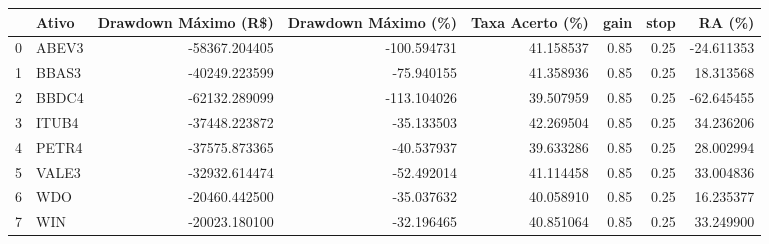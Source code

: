 \begin{tabular}{llrrrrrr}
\toprule
{} & Ativo &  Drawdown Máximo (R\$) &  Drawdown Máximo (\%)  &       Taxa Acerto (\%) &  gain &  stop &  RA (\%) \\
\midrule
0 &      ABEV3 &     -58367.204405 &                  -100.594731 &  41.158537 &  0.85 &  0.25 &          -24.611353 \\
1 &      BBAS3 &     -40249.223599 &                   -75.940155 &  41.358936 &  0.85 &  0.25 &           18.313568 \\
2 &      BBDC4 &     -62132.289099 &                  -113.104026 &  39.507959 &  0.85 &  0.25 &          -62.645455 \\
3 &      ITUB4 &     -37448.223872 &                   -35.133503 &  42.269504 &  0.85 &  0.25 &           34.236206 \\
4 &      PETR4 &     -37575.873365 &                   -40.537937 &  39.633286 &  0.85 &  0.25 &           28.002994 \\
5 &      VALE3 &     -32932.614474 &                   -52.492014 &  41.114458 &  0.85 &  0.25 &           33.004836 \\
6 &        WDO &     -20460.442500 &                   -35.037632 &  40.058910 &  0.85 &  0.25 &           16.235377 \\
7 &        WIN &     -20023.180100 &                   -32.196465 &  40.851064 &  0.85 &  0.25 &           33.249900 \\
\bottomrule
\end{tabular}
